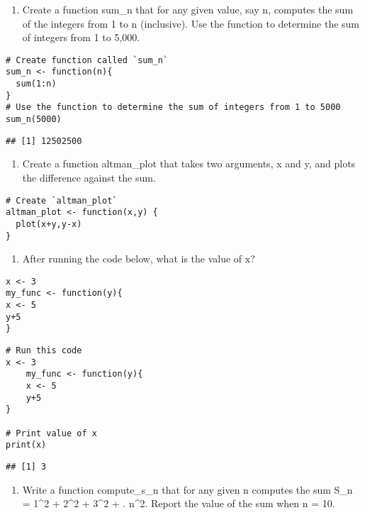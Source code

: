 \documentclass[]{article}
\providecommand{\tightlist}{%
  \setlength{\itemsep}{0pt}\setlength{\parskip}{0pt}}
\begin{document}
\begin{enumerate}
\def\labelenumi{\arabic{enumi}.}
\setcounter{enumi}{3}
\tightlist
\item
  Create a function sum\_n that for any given value, say n, computes the
  sum of the integers from 1 to n (inclusive). Use the function to
  determine the sum of integers from 1 to 5,000.
\end{enumerate}

\begin{verbatim}
# Create function called `sum_n`
sum_n <- function(n){
  sum(1:n)
}
# Use the function to determine the sum of integers from 1 to 5000
sum_n(5000)
\end{verbatim}

\begin{verbatim}
## [1] 12502500
\end{verbatim}

\begin{enumerate}
\def\labelenumi{\arabic{enumi}.}
\setcounter{enumi}{4}
\tightlist
\item
  Create a function altman\_plot that takes two arguments, x and y, and
  plots the difference against the sum.
\end{enumerate}

\begin{verbatim}
# Create `altman_plot` 
altman_plot <- function(x,y) {
  plot(x+y,y-x)
}
\end{verbatim}

\begin{enumerate}
\def\labelenumi{\arabic{enumi}.}
\setcounter{enumi}{5}
\tightlist
\item
  After running the code below, what is the value of x?
\end{enumerate}

\begin{verbatim}
x <- 3
my_func <- function(y){
x <- 5
y+5
}
\end{verbatim}

\begin{verbatim}
# Run this code 
x <- 3
    my_func <- function(y){
    x <- 5
    y+5
}

# Print value of x 
print(x)
\end{verbatim}

\begin{verbatim}
## [1] 3
\end{verbatim}

\begin{enumerate}
\def\labelenumi{\arabic{enumi}.}
\setcounter{enumi}{6}
\tightlist
\item
  Write a function compute\_s\_n that for any given n computes the sum
  S\_n = 1\^{}2 + 2\^{}2 + 3\^{}2 + . n\^{}2. Report the value of the
  sum when n = 10.
\end{enumerate}
\end{document}
